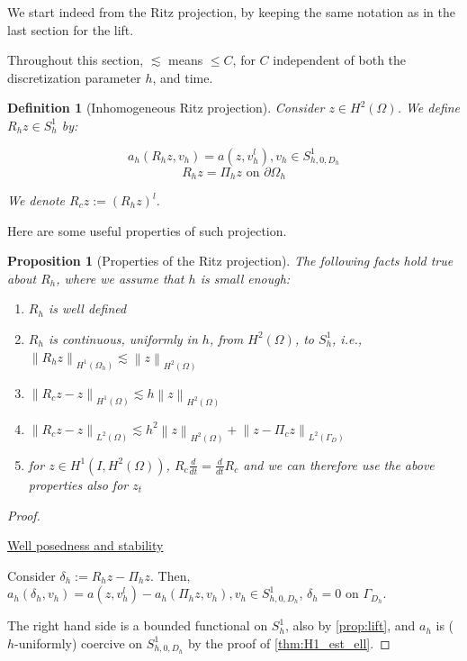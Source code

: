 \documentclass[english,a4paper,9pt,oneside]{scrbook}	%
\theoremstyle{break}
\newtheorem{defn}[equation]{Definition}
\newtheorem{prop}[equation]{Proposition}
\newenvironment{mproof}[1][\proofname]{%
  \begin{proof}[#1]$ $\par\nobreak\ignorespaces
}{%
  \end{proof}
}
\renewcommand*{\proofname}{Proof}
\theoremstyle{remark}
\newcommand{\norm}[1]{\left\lVert#1\right\rVert}
\begin{document}
\begin{appendices}
We start indeed from the Ritz projection, by keeping the same notation as in the last section for the lift.

Throughout this section, $\lesssim$ means $\leq C $, for $C$ independent of both the discretization parameter $h$, and time.

\begin{defn}[Inhomogeneous Ritz projection]
Consider $z \in H^2(\Omega)$. We define $R_h z \in S^1_h$ by:

$$a_h(R_h z , v_h) = a(z, v_h^l), v_h \in S^1_{h,0,D_h}$$
$$R_h z = \Pi_h z \text{ on } \partial \Omega_h$$

We denote $R_c z := (R_h z)^l$.

\end{defn}

Here are some useful properties of such projection.

\begin{prop}[Properties of the Ritz projection]
\label{prop:ritz}
The following facts hold true about $R_h$, where we assume that $h$ is small enough:

\begin{enumerate}
	\item $R_h$ is well defined
	\item $R_h$ is continuous, uniformly in $h$, from $H^2(\Omega)$, to $S^1_h$, i.e., $\norm{R_hz}_{H^1(\Omega_h)}\lesssim \norm{z}_{H^2(\Omega)}$
	\item $\norm{R_c z - z}_{H^1(\Omega)}\lesssim h\norm{z}_{H^2(\Omega)}$
	\item $\norm{R_c z - z}_{L^2(\Omega)}\lesssim h^2 \norm{z}_{H^2(\Omega)} + \norm{z-\Pi_c z}_{L^2(\Gamma_D)}$
	\item for $z \in H^1(I,H^2(\Omega))$, $R_c \frac{d}{dt} = \frac{d}{dt} R_c$ and we can therefore use the above properties also for $z_t$
\end{enumerate}

\end{prop}

\begin{mproof}

\underline{Well posedness and stability}

Consider $\delta_h := R_h z - \Pi_h z$. Then, $a_h(\delta_h , v_h) = a(z, v_h^l) - a_h(\Pi_h z, v_h), v_h \in S^1_{h,0,D_h}$, $\delta_h = 0$ on $\Gamma_{D_h}$.

The right hand side is a bounded functional on $S^1_h$, also by \cref{prop:lift}, and $a_h$ is ($h$-uniformly) coercive on $S^1_{h,0,D_h}$ by the proof of \cref{thm:H1_est_ell}.


\end{mproof}
\end{appendices}
\end{document}

